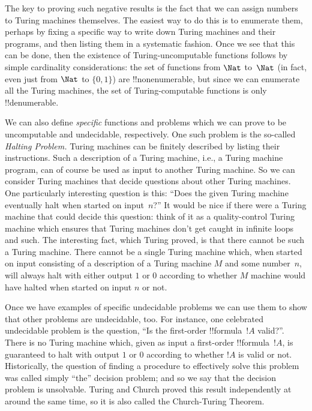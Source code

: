 \documentclass[../../../include/open-logic-section]{subfiles}
\begin{document}
The key to proving such negative results is the fact that we can
assign numbers to Turing machines themselves.  The easiest way to do
this is to enumerate them, perhaps by fixing a specific way to write
down Turing machines and their programs, and then listing them in a
systematic fashion.  Once we see that this can be done, then the
existence of Turing-uncomputable functions follows by simple
cardinality considerations: the set of functions from $\Nat$ to~$\Nat$ (in
fact, even just from $\Nat$ to $\{0, 1\}$) are !!{nonenumerable}, but
since we can enumerate all the Turing machines, the set of Turing-computable
functions is only !!{denumerable}.

We can also define \emph{specific} functions and problems which we can
prove to be uncomputable and undecidable, respectively.  One such
problem is the so-called \emph{Halting Problem.} Turing machines can
be finitely described by listing their instructions.  Such a
description of a Turing machine, i.e., a Turing machine program, can
of course be used as input to another Turing machine.  So we can
consider Turing machines that decide questions about other Turing
machines.  One particularly interesting question is this: ``Does the
given Turing machine eventually halt when started on input~$n$?''  It
would be nice if there were a Turing machine that could decide this
question: think of it as a quality-control Turing machine which
ensures that Turing machines don't get caught in infinite loops and
such.  The interesting fact, which Turing proved, is that there cannot
be such a Turing machine. There cannot be a single Turing machine
which, when started on input consisting of a description of a Turing
machine $M$ and some number~$n$, will always halt with either output
$1$ or $0$ according to whether $M$ machine would have halted when
started on input $n$ or not.

Once we have examples of specific undecidable problems we can use them
to show that other problems are undecidable, too.  For instance, one
celebrated undecidable problem is the question, ``Is the first-order
!!{formula}~$!A$ valid?''.  There is no Turing machine which, given as
input a first-order !!{formula}~$!A$, is guaranteed to halt with
output $1$ or $0$ according to whether $!A$ is valid or not.
Historically, the question of finding a procedure to effectively solve
this problem was called simply ``the'' decision problem; and so we say
that the decision problem is unsolvable.  Turing and Church proved this
result independently at around the same time, so it is also called the
Church-Turing Theorem.
\end{document}
